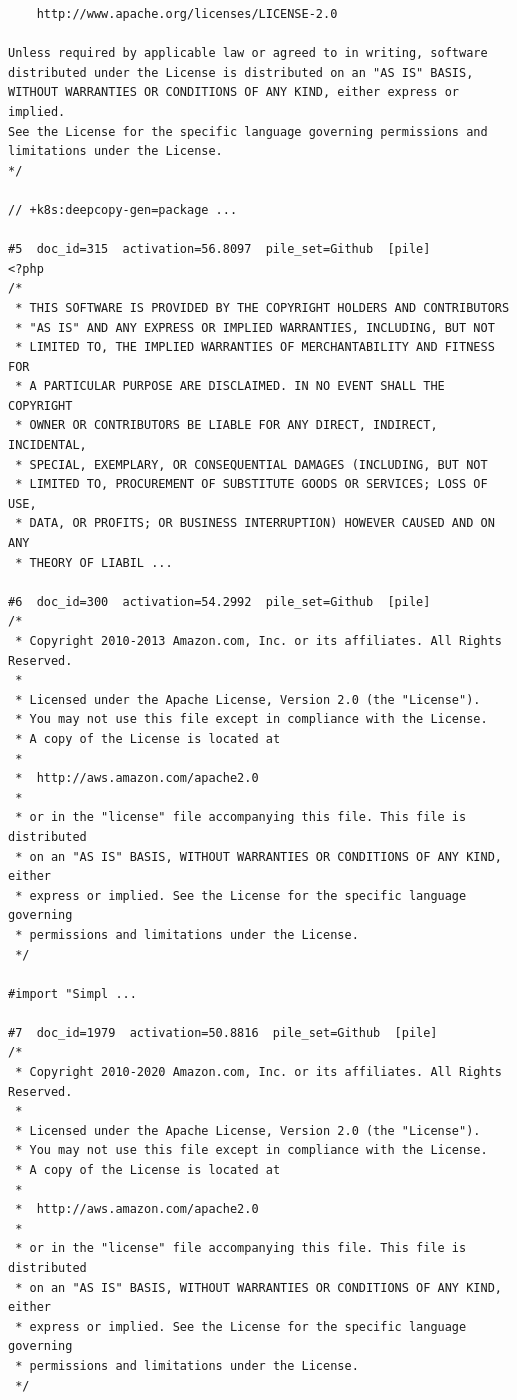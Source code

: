\begin{verbatim}
    http://www.apache.org/licenses/LICENSE-2.0

Unless required by applicable law or agreed to in writing, software
distributed under the License is distributed on an "AS IS" BASIS,
WITHOUT WARRANTIES OR CONDITIONS OF ANY KIND, either express or implied.
See the License for the specific language governing permissions and
limitations under the License.
*/

// +k8s:deepcopy-gen=package ...

#5  doc_id=315  activation=56.8097  pile_set=Github  [pile]
<?php
/*
 * THIS SOFTWARE IS PROVIDED BY THE COPYRIGHT HOLDERS AND CONTRIBUTORS
 * "AS IS" AND ANY EXPRESS OR IMPLIED WARRANTIES, INCLUDING, BUT NOT
 * LIMITED TO, THE IMPLIED WARRANTIES OF MERCHANTABILITY AND FITNESS FOR
 * A PARTICULAR PURPOSE ARE DISCLAIMED. IN NO EVENT SHALL THE COPYRIGHT
 * OWNER OR CONTRIBUTORS BE LIABLE FOR ANY DIRECT, INDIRECT, INCIDENTAL,
 * SPECIAL, EXEMPLARY, OR CONSEQUENTIAL DAMAGES (INCLUDING, BUT NOT
 * LIMITED TO, PROCUREMENT OF SUBSTITUTE GOODS OR SERVICES; LOSS OF USE,
 * DATA, OR PROFITS; OR BUSINESS INTERRUPTION) HOWEVER CAUSED AND ON ANY
 * THEORY OF LIABIL ...

#6  doc_id=300  activation=54.2992  pile_set=Github  [pile]
/*
 * Copyright 2010-2013 Amazon.com, Inc. or its affiliates. All Rights Reserved.
 *
 * Licensed under the Apache License, Version 2.0 (the "License").
 * You may not use this file except in compliance with the License.
 * A copy of the License is located at
 *
 *  http://aws.amazon.com/apache2.0
 *
 * or in the "license" file accompanying this file. This file is distributed
 * on an "AS IS" BASIS, WITHOUT WARRANTIES OR CONDITIONS OF ANY KIND, either
 * express or implied. See the License for the specific language governing
 * permissions and limitations under the License.
 */

#import "Simpl ...

#7  doc_id=1979  activation=50.8816  pile_set=Github  [pile]
/*
 * Copyright 2010-2020 Amazon.com, Inc. or its affiliates. All Rights Reserved.
 *
 * Licensed under the Apache License, Version 2.0 (the "License").
 * You may not use this file except in compliance with the License.
 * A copy of the License is located at
 *
 *  http://aws.amazon.com/apache2.0
 *
 * or in the "license" file accompanying this file. This file is distributed
 * on an "AS IS" BASIS, WITHOUT WARRANTIES OR CONDITIONS OF ANY KIND, either
 * express or implied. See the License for the specific language governing
 * permissions and limitations under the License.
 */


\end{verbatim}
